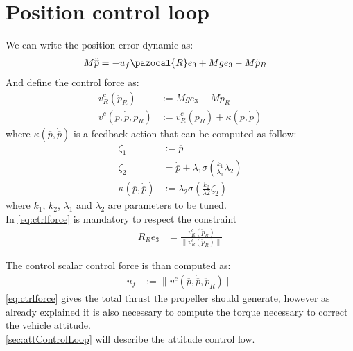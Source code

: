 \section{Position control loop}
We can write the position error dynamic as:
\begin{equation} \label{eq:poserrdyn}
\begin{split}
M \ddot{\overline{p}} &= -u_{f}\pazocal{R}e_{3} + Mge_{3} - M\ddot{p}_{R}
\end{split}
\end{equation}
And define the control force as:
\begin{equation} \label{eq:ctrlforce}
\begin{split}
v^{c}_{R}(\ddot{p}_{R})&:=Mge_{3} - M\ddot{p}_{R}\\
v^{c}(\overline{p},\dot{\overline{p}},\ddot{p}_{R})&:=v^{c}_{R}(\ddot{p}_{R}) + \kappa(\overline{p},\dot{\overline{p}} )
\end{split}
\end{equation}
where $ \kappa(\overline{p},\dot{\overline{p}}) $ is a feedback action that can be computed as follow:
\begin{equation} \label{eq:feedback}
\begin{split}
\zeta_{1}&:=\overline{p}\\
\zeta_{2}&=\dot{\overline{p}} + \lambda_{1} \sigma (\frac{k_{1}}{\lambda_{1}}\lambda_{2})\\
\kappa(\overline{p},\dot{\overline{p}}) &:=\lambda_{2}\sigma(\frac{k_{2}}{\lambda{2}}\zeta_{2})
\end{split}
\end{equation}
where $k_{1}$, $k_{2}$, $\lambda_{1}$ and $\lambda_{2}$ are parameters to be tuned.\\
In \autoref{eq:ctrlforce} is mandatory to respect the constraint
\begin{equation} \label{eq:const}
\begin{split}
R_{R}e_{3} &= \frac{v^{c}_{R}(\ddot{p}_{R})}{\lVert v^{c}_{R}(\ddot{p}_{R})\rVert}
\end{split}
\end{equation}



The control scalar control force is than computed as:
\begin{equation} \label{eq:controlForce}
\begin{split}
u_{f} &:= \lVert v^{c}(\overline{p},\dot{\overline{p}},\ddot{p}_{R})\rVert
\end{split}
\end{equation}
\autoref{eq:ctrlforce} gives the total thrust the propeller should generate, however as already explained it is also necessary to compute the torque necessary to correct the vehicle attitude.\\
\autoref{sec:attControlLoop} will describe the attitude control low.

